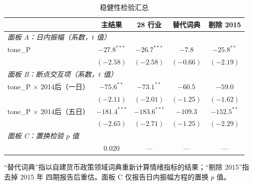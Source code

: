 \begin{table}[htbp]
\centering
\small
\begin{threeparttable}
\caption{稳健性检验汇总}
\label{tab:robust}
\begin{tabular}{lcccc}
\toprule
 & 主结果 & 28 行业 & 替代词典 & 剔除 2015 \\
\midrule
\multicolumn{5}{l}{\emph{面板 A：日内振幅（系数，$t$ 值）}} \\
tone\_P & $-27.8^{***}$ & $-26.7^{***}$ & $-7.8$ & $-25.8^{**}$ \\
        & $(-2.58)$ & $(-2.58)$ & $(-0.66)$ & $(-2.19)$ \\
\midrule
\multicolumn{5}{l}{\emph{面板 B：断点交互项（系数，$t$ 值）}} \\
tone\_P $\times$ 2014后（一日） & $-75.6^{**}$ & $-73.1^{**}$ & $-60.5$ & $-59.0$ \\
        & $(-2.11)$ & $(-2.01)$ & $(-1.25)$ & $(-1.62)$ \\
tone\_P $\times$ 2014后（五日） & $-181.4^{***}$ & $-183.6^{***}$ & $-109.3$ & $-152.5^{**}$ \\
        & $(-2.65)$ & $(-2.71)$ & $(-1.25)$ & $(-2.29)$ \\
\midrule
\multicolumn{5}{l}{\emph{面板 C：置换检验 $p$ 值}} \\
 & 0.020 & — & — & — \\
\bottomrule
\end{tabular}
\begin{tablenotes}[flushleft]
\footnotesize
\item ``替代词典''指以自建货币政策领域词典重新计算情绪指标的结果；``剔除 2015''指去掉 2015 年
四期报告后重估。面板 C 仅报告日内振幅方程的置换 $p$ 值。
\end{tablenotes}
\end{threeparttable}
\end{table}

